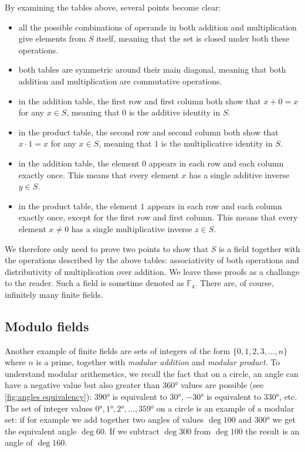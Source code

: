 \flushleft
By examining the tables above, several points become clear:
\begin{itemize}
	\item all the possible combinations of operands in both addition and multiplication give elements from $S$ itself, meaning that the set is closed under both these operations.
	\item both tables are symmetric around their main diagonal, meaning that both addition and multiplication are commutative operations.
	\item in the addition table, the first row and first column both show that $x+0=x$ for any $x\in S$, meaning that $0$ is the additive identity in $S$.
	\item in the product table, the second row and second column both show that $x\cdot1=x$ for any $x\in S$, meaning that $1$ is the multiplicative identity in $S$.
	\item in the addition table, the element $0$ appears in each row and each column exactly once. This means that every element $x$ has a single additive inverse $y\in S$.
	\item in the product table, the element $1$ appears in each row and each column exactly once, except for the first row and first column. This means that every element $x\neq 0$ has a single multiplicative inverse $z\in S$.
\end{itemize}

We therefore only need to prove two points to show that $S$ is a field together with the operations described by the above tables: associativity of both operations and distributivity of multiplication over addition. We leave these proofs as a challange to the reader. Such a field is sometime denoted as $\mathbb{F}_{4}$. There are, of course, infinitely many finite fields.

\subsection{Modulo fields}
Another example of finite fields are sets of integers of the form $\{0,1,2,3,\dots,n\}$ where $n$ is a prime, together with \emph{modular addition} and \emph{modular product}. To understand modular arithemetics, we recall the fact that on a circle, an angle can have a negative value but also greater than $\ang{360}$ values are possible (see \autoref{fig:angles equivalency}): $\ang{390}$ is equivalent to $\ang{30}$, $\ang{-30}$ is equivalent to $\ang{330}$, etc. The set of integer values $\ang{0},\ang{1},\ang{2},\dots,\ang{359}$ on a circle is an example of a modular set: if for example we add together two angles of values $\deg{100}$ and $\ang{300}$ we get the equivalent angle $\deg{60}$. If we subtract $\deg{300}$ from $\deg{100}$ the result is an angle of $\deg{160}$.

